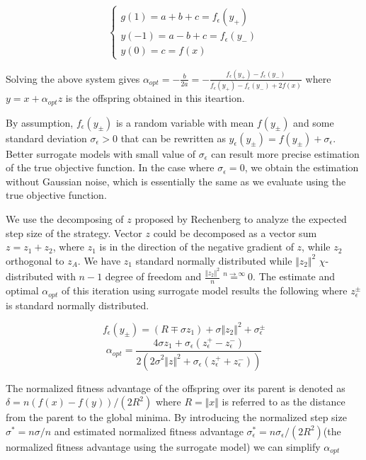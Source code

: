 $$ \begin{cases}  g(1) = a+b+c= f_{\epsilon }(y_+)    \\ y(-1) = a-b+c = f_{\epsilon }(y_-)  \\ y(0)  = c = f(x)  \end{cases}$$

Solving the above system gives $\alpha_{opt} = -\frac{b}{2a}  = -\frac{f_\epsilon(y_+) - f_\epsilon(y_-)}{f_\epsilon(y_+) - f_\epsilon(y_-) + 2f(x) } $ where $y = x + \alpha_{opt} z$ is the offspring obtained in this iteartion.
 

By assumption, $f_\epsilon(y_\pm)$ is a random variable with mean $f(y_\pm)$ and some standard deviation $\sigma_\epsilon > 0$ that can be rewritten as $y_\epsilon(y_\pm) = f(y_\pm) + \sigma_\epsilon$. Better surrogate models with small value of $\sigma_\epsilon$ can result more precise estimation of the true objective function. In the case where $\sigma_\epsilon = 0$, we obtain the estimation without Gaussian noise, which is essentially the same as we evaluate using the true objective function.


We use the decomposing of $z$ proposed by Rechenberg \cite{rechenberg1973evolutionsstrategie} to analyze the expected step size of the strategy. Vector $z$ could be decomposed as a vector sum $z = z_1+z_2$, where $z_1$ is in the direction of the negative gradient of $z$, while $z_2$ orthogonal  to $z_A$. We have $z_1$ standard normally distributed while $\Vert z_2\Vert^2$ $\chi$-distributed with $n-1$ degree of freedom and $\frac{\Vert z_2\Vert^2}{n} \overset{n \rightarrow \infty }{=} 0$. The estimate and optimal $\alpha_{opt}$ of this iteration using surrogate model results the following where $z_\epsilon^\pm$ is standard normally distributed.

$$f_\epsilon(y_\pm) = (R \mp \sigma z_1)+\sigma \Vert z_2\Vert^2 + \sigma_\epsilon^\pm$$
$$ \alpha_{opt} =   \frac{4 \sigma z_1 + \sigma_{\epsilon} (z_{\epsilon}^+  - z_{\epsilon}^-  )}{   2({2\sigma}^2 \Vert z\Vert^2 + \sigma_{\epsilon} (z_{\epsilon}^+  + z_{\epsilon}^- ) ) } $$ 

The normalized fitness advantage of the offspring over its parent is denoted as $\delta = n(f(x)-f(y)) /(2R^2)$ where $R= \Vert x \Vert$ is referred to as the distance from the parent to the global minima. By introducing the normalized step size $\sigma^* = n \sigma /n$ and estimated normalized fitness advantage $\sigma_\epsilon^* = n \sigma_\epsilon /(2R^2)$(the normalized fitness advantage using the surrogate model) we can simplify $\alpha_{opt}$ 

